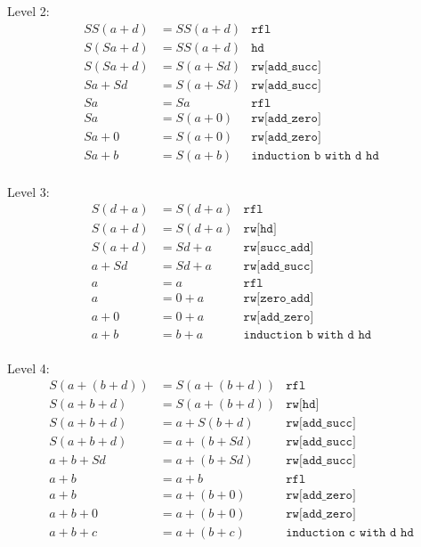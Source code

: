 \documentclass{article}
\theoremstyle{theorem}
\theoremstyle{definition}
\theoremstyle{remark}
\begin{document}
Level 2:
\begin{align*}
  SS(a+d)&=SS(a+d) & \texttt{rfl} \\
  S(Sa+d)&=SS(a+d) & \texttt{hd} \\
  S(Sa+d)&=S(a+Sd) & \texttt{rw[add\_succ]} \\
  Sa+Sd&=S(a+Sd) & \texttt{rw[add\_succ]} \\
  Sa&=Sa & \texttt{rfl} \\
  Sa&=S(a+0) & \texttt{rw[add\_zero]} \\
  Sa+0&=S(a+0) & \texttt{rw[add\_zero]} \\
  Sa+b&=S(a+b) & \texttt{induction b with d hd} \\
\end{align*}

Level 3:
\begin{align*}
  S(d+a)&=S(d+a) & \texttt{rfl} \\
  S(a+d)&=S(d+a) & \texttt{rw[hd]} \\
  S(a+d)&=Sd+a & \texttt{rw[succ\_add]} \\
  a+Sd&=Sd+a & \texttt{rw[add\_succ]} \\
  a&=a & \texttt{rfl} \\
  a&=0+a & \texttt{rw[zero\_add]} \\
  a+0&=0+a & \texttt{rw[add\_zero]} \\
  a+b&=b+a & \texttt{induction b with d hd} \\
\end{align*}

Level 4:
\begin{align*}
  S(a+(b+d))&=S(a+(b+d)) & \texttt{rfl} \\
  S(a+b+d)&=S(a+(b+d)) & \texttt{rw[hd]} \\
  S(a+b+d)&=a+S(b+d) & \texttt{rw[add\_succ]} \\
  S(a+b+d)&=a+(b+Sd) & \texttt{rw[add\_succ]} \\
  a+b+Sd&=a+(b+Sd) & \texttt{rw[add\_succ]} \\
  a+b&=a+b & \texttt{rfl} \\
  a+b&=a+(b+0) & \texttt{rw[add\_zero]} \\
  a+b+0&=a+(b+0) & \texttt{rw[add\_zero]} \\
  a+b+c&=a+(b+c) & \texttt{induction c with d hd} \\
\end{align*}
\end{document}
